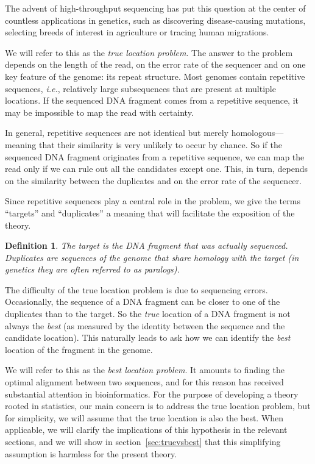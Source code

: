 \documentclass{article}
\newtheorem{definition}{Definition}
\begin{document}
The advent of high-throughput sequencing has put this question at the
center of countless applications in genetics, such as discovering
disease-causing mutations, selecting breeds of interest in agriculture or
tracing human migrations.

We will refer to this as the \emph{true location problem}. The answer to
the problem depends on the length of the read, on the error rate of the
sequencer and on one key feature of the genome: its repeat structure.
Most genomes contain repetitive sequences, \textit{i.e.}, relatively large
subsequences that are present at multiple locations. If the sequenced DNA
fragment comes from a repetitive sequence, it may be impossible to map the
read with certainty.

In general, repetitive sequences are not identical but merely
homologous---meaning that their similarity is very unlikely to occur by
chance. So if the sequenced DNA fragment originates from a repetitive
sequence, we can map the read only if we can rule out all the candidates
except one. This, in turn, depends on the similarity between the
duplicates and on the error rate of the sequencer.

Since repetitive sequences play a central role in the problem, we give the
terms ``targets'' and ``duplicates'' a meaning that will facilitate the
exposition of the theory.

\begin{definition}
\label{def_dup}
The target is the DNA fragment that was actually sequenced. Duplicates are
sequences of the genome that share homology with the target (in genetics
they are often referred to as paralogs).
\end{definition}

The difficulty of the true location problem is due to sequencing errors.
Occasionally, the sequence of a DNA fragment can be closer to one of the
duplicates than to the target. So the \emph{true} location of a DNA
fragment is not always the \emph{best} (as measured by the identity
between the sequence and the candidate location). This naturally leads to
ask how we can identify the \emph{best} location of the fragment in
the genome.

We will refer to this as the \emph{best location problem}. It amounts to
finding the optimal alignment between two sequences, and for this reason
has received substantial attention in bioinformatics. For the purpose of
developing a theory rooted in statistics, our main concern is to address
the true location problem, but for simplicity, we will assume that the
true location is also the best. When applicable, we will clarify the
implications of this hypothesis in the relevant sections, and we will show
in section~\ref{sec:truevsbest} that this simplifying assumption is harmless for
the present theory.
\end{document}
